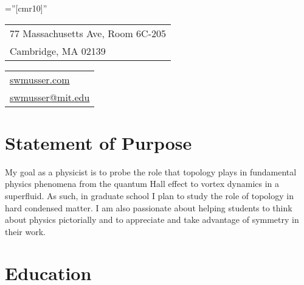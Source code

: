 \documentclass[10pt]{article} %
\begin{document}
\newcommand{\com}[1]{}

\pagestyle{empty} %

\font\fb=''[cmr10]'' %

\par{\bigskip\par} %



\begin{tabular}[t]{@{}l} 
  77 Massachusetts Ave, Room 6C-205\\
  Cambridge, MA 02139
\end{tabular}
\hfill%
\begin{tabular}[t]{l@{}}
	\href{https://swmusser.com}{swmusser.com}\\
	\href{mailto:swmusser@mit.edu}{swmusser@mit.edu}
\end{tabular}


\section{Statement of Purpose}

My goal as a physicist is to probe the role that topology plays in fundamental physics phenomena from the quantum Hall effect to vortex dynamics in a superfluid.  As such, in graduate school I plan to study the role of topology in hard condensed matter.  I am also passionate about helping students to think about physics pictorially and to appreciate and take advantage of symmetry in their work.



\section{Education}
\end{document}
